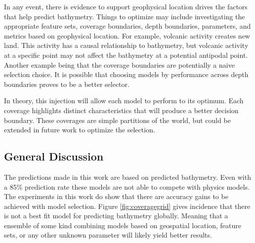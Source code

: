 
\par
In any event, there is evidence to support geophysical location drives the factors that help predict bathymetry.
Things to optimize may include investigating the appropriate feature sets, coverage boundaries, depth boundaries, parameters, and metrics based on geophysical location.
For example, volcanic activity creates new land.
This activity has a causal relationship to bathymetry, but volcanic activity at a specific point may not affect the bathymetry at a potential antipodal point.
Another example being that the coverage boundaries are potentially a naive selection choice.
It is possible that choosing models by performance across depth boundaries proves to be a better selector.
\par
In theory, this injection will allow each model to perform to its optimum.
Each coverage highlights distinct characteristics that will produce a better decision boundary.
These coverages are simple partitions of the world, but could be extended in future work to optimize the selection.




\subsection{General Discussion}
The predictions made in this work are based on predicted bathymetry.
Even with a 85\% prediction rate these models are not able to compete with physics models.
The experiments in this work do show that there are accuracy gains to be achieved with model selection.
Figure \ref{fig:coveragegrid} gives incidence that there is not a best fit model for predicting bathymetry globally.
Meaning that a ensemble of some kind combining models based on geospatial location, feature sets, or any other unknown parameter will likely yield better results.